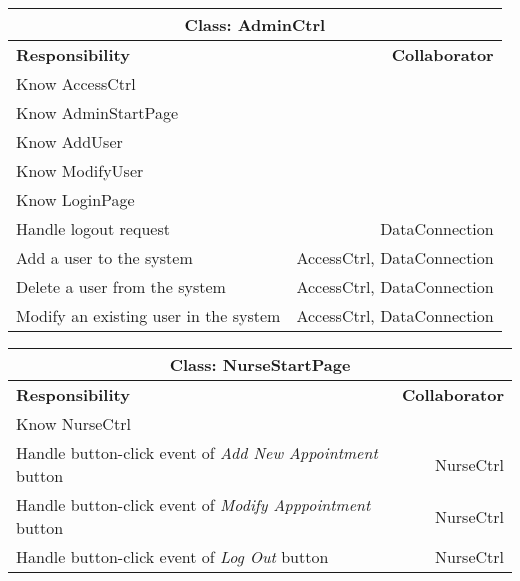 \documentclass[12pt]{article}
\begin{document}
\begin{center}
\begin{tabularx}{\textwidth}{|X|r|} \hline
\multicolumn{2}{|c|}{\textbf{Class: AdminCtrl}}\\ \hline
\textbf{Responsibility} & \textbf{Collaborator} \\ \hline
Know AccessCtrl                             &                                  \\ \hline 
Know AdminStartPage                  &                             \\ \hline
Know AddUser                                &                                 \\ \hline
Know ModifyUser                                   &                                 \\ \hline
Know LoginPage                                   &                                 \\ \hline
Handle logout request                                 &  DataConnection                                 \\ \hline
Add a user to the system & AccessCtrl, DataConnection \\ \hline
Delete a user from the system & AccessCtrl, DataConnection\\ \hline
Modify an existing user in the system & AccessCtrl, DataConnection\\ \hline



\end{tabularx}
\newline\newline
\end{center}

\begin{center}
\begin{tabularx}{\textwidth}{|X|r|} \hline
\multicolumn{2}{|c|}{\textbf{Class: NurseStartPage}}\\ \hline
\textbf{Responsibility} & \textbf{Collaborator} \\ \hline
Know NurseCtrl & \\ \hline
Handle button-click event of \emph{Add New Appointment} button & NurseCtrl \\ \hline
Handle button-click event of \emph{Modify Apppointment} button & NurseCtrl \\ \hline
Handle button-click event of \emph{Log Out} button & NurseCtrl \\ \hline
\end{tabularx}
\newline\newline
\end{center}
\end{document}
